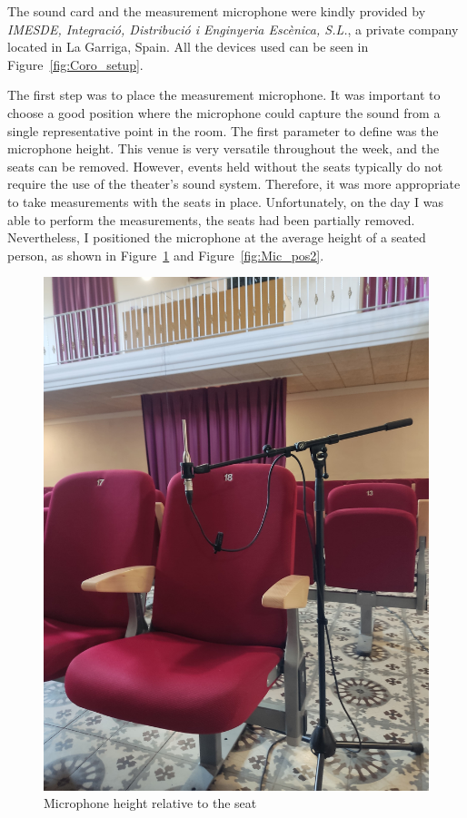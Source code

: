 The sound card and the measurement microphone were kindly provided by \textit{IMESDE, Integració, Distribució i Enginyeria Escènica, S.L.}, a private company located in La Garriga, Spain. All the devices used can be seen in Figure~\ref{fig:Coro_setup}.

The first step was to place the measurement microphone. It was important to choose a good position where the microphone could capture the sound from a single representative point in the room. The first parameter to define was the microphone height. This venue is very versatile throughout the week, and the seats can be removed. However, events held without the seats typically do not require the use of the theater's sound system. Therefore, it was more appropriate to take measurements with the seats in place. Unfortunately, on the day I was able to perform the measurements, the seats had been partially removed. Nevertheless, I positioned the microphone at the average height of a seated person, as shown in Figure~\ref{fig:Mic_pos1} and Figure~\ref{fig:Mic_pos2}.

\begin{figure}[H]
	\centering
	\includegraphics[width=0.6
	\linewidth]{Figures/Coro_micpos1.jpeg}
	\caption{Microphone height relative to the seat}
	\label{fig:Mic_pos1}
\end{figure}


